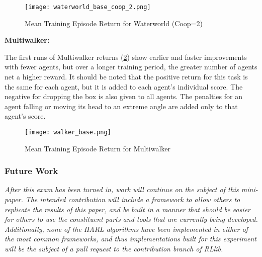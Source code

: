 \begin{figure}
    \centering
    \texttt{[image: waterworld\_base\_coop\_2.png]}
    \caption{Mean Training Episode Return for Waterworld (Coop=2)}
    \label{fig:ww_base_2co}
\end{figure}

\textbf{Multiwalker:}

The first runs of Multiwalker returns (\cref{fig:walker_base})
show earlier and faster improvements with fewer agents,
but over a longer training period, the greater number of agents
net a higher reward.
It should be noted that the positive return for this task is the same for 
each agent, but it is added to each agent's individual score.
The negative for dropping the box is also given to all agents.
The penalties for an agent falling or moving its head to an extreme 
angle are added only to that agent's score.

\begin{figure}
    \centering
    \texttt{[image: walker\_base.png]}
    \caption{Mean Training Episode Return for Multiwalker}
    \label{fig:walker_base}
\end{figure}


\subsubsection*{Future Work}
\emph{
    After this exam has been turned in, work will continue on the subject of
    this mini-paper. The intended contribution will include a framework
    to allow others to replicate the results of this paper, 
    and be built in a manner that should be easier for others to use
    the constituent parts and tools that are currently being developed.
    Additionally, none of the HARL algorithms have been implemented in 
    either of the most common frameworks, and thus implementations
    built for this experiment will be the subject of a pull request
    to the contribution branch of RLlib.
}

